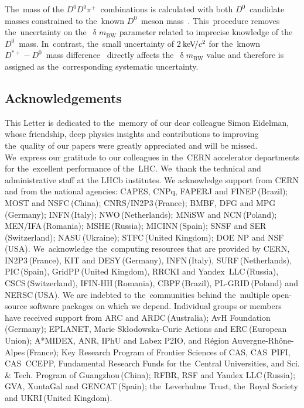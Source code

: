 \documentclass[12pt,a4paper]{article}
\def\Ppi         {\ensuremath{\uppi}\xspace}
\def\PD      {\ensuremath{\mathrm{D}}\xspace}
\def\Ppi         {\ensuremath{\pi}\xspace}
\def\PD      {\ensuremath{D}\xspace}
\def\pion   {{\ensuremath{\Ppi}}\xspace}
\def\pip    {{\ensuremath{\pion^+}}\xspace}
\def\D       {{\ensuremath{\PD}}\xspace}
\def\Dz      {{\ensuremath{\D^0}}\xspace}
\def\Dstarp  {{\ensuremath{\D^{*+}}}\xspace}
\newcommand{\aunit}[1]{\ensuremath{\text{\,#1}}}
\newcommand{\kevcc}{\ensuremath{\aunit{ke\kern -0.1em V\!/}c^2}\xspace}
\begin{document}
The~mass of the $\Dz\Dz\pip$~combinations is 
calculated 
with both \Dz~candidate masses 
constrained 
to the~known $\Dz$~meson mass~\cite{PDG2021}.
This~procedure removes 
the~uncertainty on the~$\updelta m_{\mathrm{BW}}$ 
parameter related to 
imprecise knowledge of the~\Dz~mass.
In~contrast, the~small uncertainty of 2\kevcc for 
the~known 
$\Dstarp-\Dz$~mass difference~\cite{
PDG2021}
directly affects the~$\updelta m_{\mathrm{BW}}$ value
and therefore is assigned as 
the~corresponding systematic uncertainty. 
 

\subsection*{Acknowledgements}
This Letter is dedicated 
to the~memory of our dear colleague 
Simon Eidelman, whose friendship, 
deep physics insights and contributions 
to improving the~quality of our papers 
were greatly appreciated and will be missed. 
We~express our gratitude to our colleagues in the~CERN
accelerator departments for the~excellent performance of the~LHC. 
We~thank the technical and administrative staff at the LHCb
institutes.
We acknowledge support from CERN 
and from the national agencies:
CAPES, CNPq, FAPERJ and FINEP\,(Brazil); 
MOST and NSFC\,(China); 
CNRS/IN2P3\,(France); 
BMBF, DFG and MPG\,(Germany); 
INFN\,(Italy); 
NWO\,(Netherlands); 
MNiSW and NCN\,(Poland); 
MEN/IFA\,(Romania); 
MSHE\,(Russia); 
MICINN\,(Spain); 
SNSF and SER\,(Switzerland); 
NASU\,(Ukraine); 
STFC\,(United Kingdom); 
DOE NP and NSF\,(USA).
We~acknowledge the~computing resources that are provided by CERN, 
IN2P3\,(France), 
KIT and DESY\,(Germany), 
INFN\,(Italy), 
SURF\,(Netherlands),
PIC\,(Spain), 
GridPP\,(United Kingdom), 
RRCKI and Yandex~LLC\,(Russia), 
CSCS\,(Switzerland), 
IFIN-HH\,(Romania), 
CBPF\,(Brazil),
PL\nobreakdash-GRID\,(Poland) and NERSC\,(USA).
We are indebted to the~communities behind 
the~multiple open-source
software packages on which we depend.
Individual groups or members have received support from
ARC and ARDC\,(Australia);
AvH Foundation\,(Germany);
EPLANET, Marie Sk\l{}odowska-Curie Actions and ERC\,(European Union);
A*MIDEX, ANR, IPhU and Labex P2IO, and R\'{e}gion 
Auvergne-Rh\^{o}ne-Alpes\,(France);
Key Research Program of Frontier Sciences of CAS, 
CAS~PIFI, CAS~CCEPP, 
Fundamental Research Funds for the~Central Universities, 
and Sci. \& Tech. Program of Guangzhou\,(China);
RFBR, RSF and Yandex LLC\,(Russia);
GVA, XuntaGal and GENCAT\,(Spain);
the~Leverhulme Trust, the~Royal Society
 and UKRI\,(United Kingdom).
\end{document}
